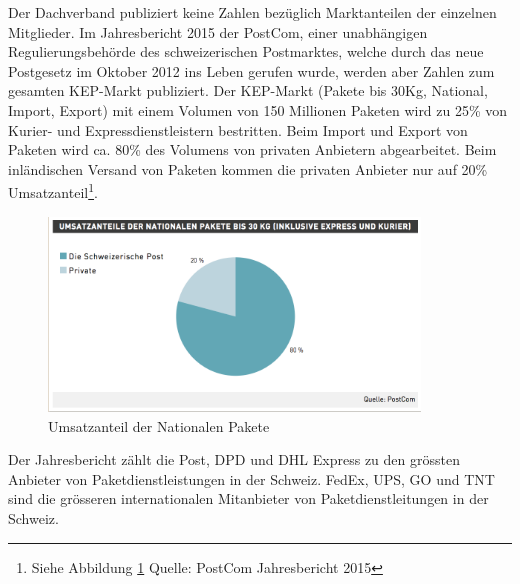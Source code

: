 Der Dachverband publiziert keine Zahlen bezüglich Marktanteilen der einzelnen Mitglieder. Im Jahresbericht 2015 \citep[S.32]{postCom.2015} der PostCom, einer unabhängigen Regulierungsbehörde des schweizerischen Postmarktes, welche durch das neue Postgesetz im Oktober 2012 ins Leben gerufen wurde, werden aber Zahlen zum gesamten KEP-Markt publiziert. Der KEP-Markt (Pakete bis 30Kg, National, Import, Export) mit einem Volumen von 150 Millionen Paketen wird zu 25\% von Kurier- und Expressdienstleistern bestritten. Beim Import und Export von Paketen wird ca. 80\% des Volumens von privaten Anbietern abgearbeitet. Beim inländischen Versand von Paketen kommen die privaten Anbieter nur auf 20\% Umsatzanteil\footnote{Siehe Abbildung \ref{fig1:umsatzanteil} Quelle: PostCom Jahresbericht 2015}.
\begin{figure}[ht]
	\centering
  \includegraphics[width=0.88\textwidth]{images/umsatzanteilNational.png}
	\caption{Umsatzanteil der Nationalen Pakete} %
	\label{fig1:umsatzanteil}
\end{figure}
Der Jahresbericht zählt die Post, DPD und DHL Express zu den grössten Anbieter von Paketdienstleistungen in der Schweiz. FedEx, UPS, GO und TNT sind die grösseren internationalen Mitanbieter von Paketdienstleitungen in der Schweiz.

